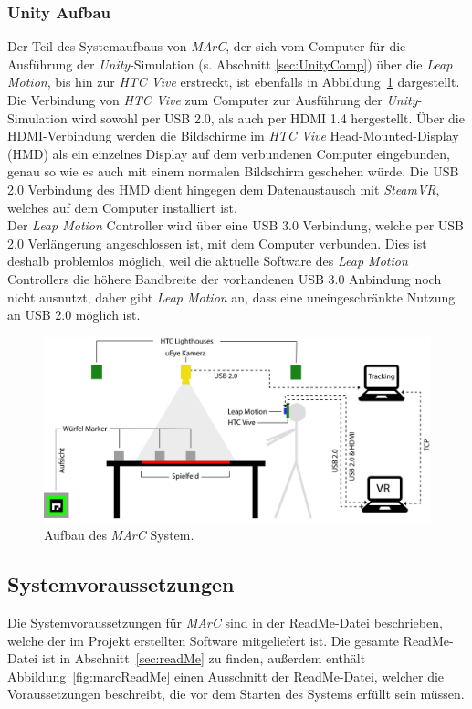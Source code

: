 \subsubsection{Unity Aufbau}
Der Teil des Systemaufbaus von \emph{MArC}, der sich vom Computer für die Ausführung der \emph{Unity}-Simulation (s. Abschnitt \ref{sec:UnityComp}) über die \emph{Leap Motion}, bis hin zur \emph{HTC Vive} erstreckt, ist ebenfalls in Abbildung~\ref{fig:AufbauMarc} dargestellt.\\
Die Verbindung von \emph{HTC Vive} zum Computer zur Ausführung der \emph{Unity}-Simulation wird sowohl per USB 2.0, als auch per HDMI 1.4 hergestellt. Über die HDMI-Verbindung werden die Bildschirme im \emph{HTC Vive} Head-Mounted-Display (HMD) als ein einzelnes Display auf dem verbundenen Computer eingebunden, genau so wie es auch mit einem normalen Bildschirm geschehen würde. Die USB 2.0 Verbindung des HMD dient hingegen dem Datenaustausch mit \emph{SteamVR}, welches auf dem Computer installiert ist.\\
Der \emph{Leap Motion} Controller wird über eine USB 3.0 Verbindung, welche per USB 2.0 Verlängerung angeschlossen ist, mit dem Computer verbunden. Dies ist deshalb problemlos möglich, weil die aktuelle Software des \emph{Leap Motion} Controllers die höhere Bandbreite der vorhandenen USB 3.0 Anbindung noch nicht ausnutzt, daher gibt \emph{Leap Motion} an, dass eine uneingeschränkte Nutzung an USB 2.0 möglich ist.~\cite{website:LeapMotionSupportQuestion}

\begin{figure}[H]
	\centering
	\includegraphics[width=\textwidth]{Bilder/Aufbau_MArC.jpg}
	\caption{Aufbau des \textit{MArC} System.}
	\label{fig:AufbauMarc}
\end{figure}


\subsection{Systemvoraussetzungen}\label{sec:sysVor}
Die Systemvoraussetzungen für \emph{MArC} sind in der ReadMe-Datei beschrieben, welche der im Projekt erstellten Software mitgeliefert ist. Die gesamte ReadMe-Datei ist in Abschnitt~\ref{sec:readMe} zu finden, außerdem enthält Abbildung~\ref{fig:marcReadMe} einen Ausschnitt der ReadMe-Datei, welcher die Voraussetzungen beschreibt, die vor dem Starten des Systems erfüllt sein müssen.

